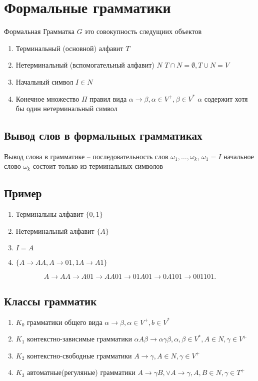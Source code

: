 \documentclass[14pt]{extarticle}
\begin{document}
\section{Формальные грамматики}
Формальная Грамматка $G$ это совокупность следущиих объектов
 \begin{enumerate}
    \item Терминальный (основной) алфавит $T$
    \item Нетерминальный (вспомогательный алфавит) $N$  $T \cap N = \emptyset, T \cup N = V$
    \item Начальный символ  $I \in N$
    \item Конечное множество  $\Pi$ правил вида  $\alpha \to \beta , \alpha \in V^{+},\beta \in V^{*}$ $\alpha$ содержит хотя бы один нетерминальный символ
\end{enumerate}
\subsection{Вывод слов в формальных грамматиках}
Вывод слова в грамматике -- последовательность слов $\omega_1,\dots,\omega_{k}$,
$\omega_1 = I$ начальное слово $\omega_{k}$ состоит только из терминальных символов
\subsection{Пример}
\begin{enumerate}
    \item Терминальны алфавит $\{0,1\}$
    \item  Нетерминальный алфавит  $\{A\}$
    \item  $I = A$
    \item  $\{A \to AA, A \to 01, 1A \to A1\}$
\end{enumerate}
\[
A \to AA \to A01 \to AA01 \to 01A01 \to 0A101 \to 001101
.\] 
\subsection{Классы грамматик}
\begin{enumerate}
    \item $K_0$ грамматики общего вида $\alpha \to \beta , \alpha \in V^{+},b \in V^{*}$
     \item $K_1$ контекстно-зависимые грамматики $\alpha A \beta \to \alpha \gamma \beta, \alpha,\beta \in V^{*},A \in N,\gamma \in V^{+}$
     \item $K_2$ контекстно-свободные грамматики $A \to \gamma, A \in N,\gamma \in V^{+}$
     \item $K_3$ автоматные(регуляные) грамматики $A \to \gamma B, \lor A \to \gamma,
         A, B \in N,\gamma\in T^{+}$
\end{enumerate}
\end{document}
